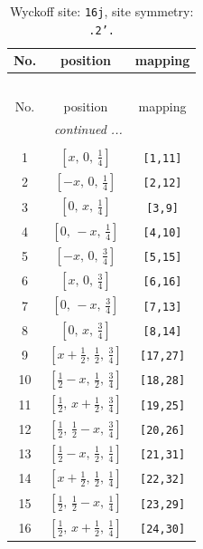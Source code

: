 \documentclass[fleqn,8pt]{jsarticle}
\begin{document}
\renewcommand{\arraystretch}{1.2}
\begin{longtable}{ccc}
\caption{Wyckoff site: {\tt 16j}, site symmetry: {\tt .2'.}}
 \\
 \hline \hline
No. & position & mapping \\ \hline \endfirsthead

\multicolumn{2}{l}{\tablename\ \thetable{}} \\
 \hline \hline
No. & position & mapping \\ \hline \endhead

 \hline \hline
\multicolumn{2}{r}{\footnotesize\it continued ...} \\ \endfoot

 \hline \hline
\multicolumn{2}{r}{} \\ \endlastfoot

1 & $\left[ x,\, 0,\, \frac{1}{4} \right]$ & {\tt [1,11]} \\ \hline
2 & $\left[ - x,\, 0,\, \frac{1}{4} \right]$ & {\tt [2,12]} \\ \hline
3 & $\left[ 0,\, x,\, \frac{1}{4} \right]$ & {\tt [3,9]} \\ \hline
4 & $\left[ 0,\, - x,\, \frac{1}{4} \right]$ & {\tt [4,10]} \\ \hline
5 & $\left[ - x,\, 0,\, \frac{3}{4} \right]$ & {\tt [5,15]} \\ \hline
6 & $\left[ x,\, 0,\, \frac{3}{4} \right]$ & {\tt [6,16]} \\ \hline
7 & $\left[ 0,\, - x,\, \frac{3}{4} \right]$ & {\tt [7,13]} \\ \hline
8 & $\left[ 0,\, x,\, \frac{3}{4} \right]$ & {\tt [8,14]} \\ \hline
9 & $\left[ x + \frac{1}{2},\, \frac{1}{2},\, \frac{3}{4} \right]$ & {\tt [17,27]} \\ \hline
10 & $\left[ \frac{1}{2} - x,\, \frac{1}{2},\, \frac{3}{4} \right]$ & {\tt [18,28]} \\ \hline
11 & $\left[ \frac{1}{2},\, x + \frac{1}{2},\, \frac{3}{4} \right]$ & {\tt [19,25]} \\ \hline
12 & $\left[ \frac{1}{2},\, \frac{1}{2} - x,\, \frac{3}{4} \right]$ & {\tt [20,26]} \\ \hline
13 & $\left[ \frac{1}{2} - x,\, \frac{1}{2},\, \frac{1}{4} \right]$ & {\tt [21,31]} \\ \hline
14 & $\left[ x + \frac{1}{2},\, \frac{1}{2},\, \frac{1}{4} \right]$ & {\tt [22,32]} \\ \hline
15 & $\left[ \frac{1}{2},\, \frac{1}{2} - x,\, \frac{1}{4} \right]$ & {\tt [23,29]} \\ \hline
16 & $\left[ \frac{1}{2},\, x + \frac{1}{2},\, \frac{1}{4} \right]$ & {\tt [24,30]} \\
\end{longtable}
\end{document}

